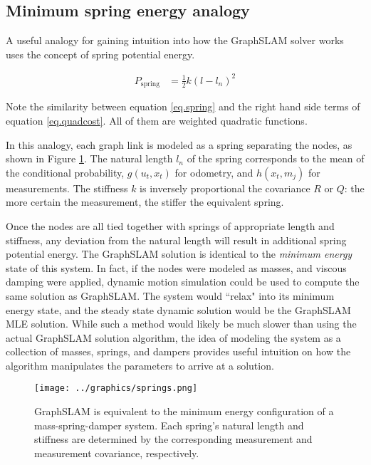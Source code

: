 \subsection{Minimum spring energy analogy}

A useful analogy for gaining intuition into how the GraphSLAM solver works uses the concept of spring potential energy. 

\begin{align}
P_{\text{spring}} &= \frac{1}{2}k\left(l-l_n\right)^2
\label{eq.spring}
\end{align}

Note the similarity between equation \ref{eq.spring} and the right hand side terms of equation \ref{eq.quadcost}. All of them are weighted quadratic functions.

In this analogy, each graph link is modeled as a spring separating the nodes, as shown in Figure \ref{fig:springs}. The natural length $l_n$ of the spring corresponds to the mean of the conditional probability,  $g\left(u_t,x_t\right)$ for odometry, and $h\left(x_t,m_j\right)$ for measurements. The stiffness $k$ is inversely proportional the covariance $R$ or $Q$: the more certain the measurement, the stiffer the equivalent spring. 

Once the nodes are all tied together with springs of appropriate length and stiffness, any deviation from the natural length will result in additional spring potential energy. The GraphSLAM solution is identical to the \emph{minimum energy} state of this system. In fact, if the nodes were modeled as masses, and viscous damping were applied, dynamic motion simulation could be used to compute the same solution as GraphSLAM. The system would ``relax" into its minimum energy state, and the steady state dynamic solution would be the GraphSLAM MLE solution. While such a method would likely be much slower than using the actual GraphSLAM solution algorithm, the idea of modeling the system as a collection of masses, springs, and dampers provides useful intuition on how the algorithm manipulates the parameters to arrive at a solution.

\begin{figure}[htb]
   \centering
   \texttt{[image: ../graphics/springs.png]} %
   \caption{GraphSLAM is equivalent to the minimum energy configuration of a mass-spring-damper system. Each spring's natural length and stiffness are determined by the corresponding measurement and measurement covariance, respectively.}
   \label{fig:springs}
\end{figure}




